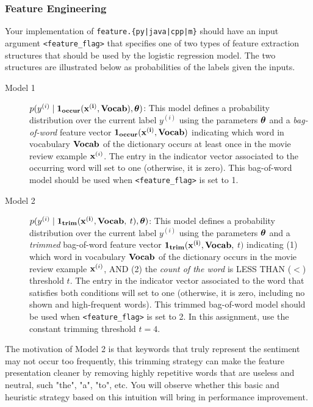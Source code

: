 \subsubsection{Feature Engineering} \label{feature}

Your implementation of \texttt{feature.\{py|java|cpp|m\}} should have an input argument \texttt{<feature\_flag>} that specifies one of two types of feature extraction structures that should be used by the logistic regression model. The two structures are illustrated below as probabilities of the labels given the inputs.

\begin{description}
    \item[Model 1] $p(y^{(i)} \mid \bf{1}_{occur}( \mathbf x^{(i)},Vocab), \boldsymbol \theta)$: This model defines a probability distribution over the current label $y^{(i)}$ using the parameters $\boldsymbol \theta$ and a \emph{bag-of-word} feature vector $\bf{1}_{occur}( \mathbf x^{(i)},Vocab)$ indicating which word in vocabulary $\bf{Vocab}$ of the dictionary occurs at least once in the movie review example $\mathbf x^{(i)}$. The entry in the indicator vector associated  to the occurring word will set to one (otherwise, it is zero). This bag-of-word model should be used when \texttt{<feature\_flag>} is set to 1.
    
    \item[Model 2] $p(y^{(i)} \mid \bf{1}_{trim}(  \mathbf x^{(i)},Vocab,$ $t), \boldsymbol \theta)$: This model defines a probability distribution over the current label $y^{(i)}$ using the parameters $\boldsymbol \theta$ and a \emph{trimmed} bag-of-word feature vector $\bf{1}_{trim}( \mathbf x^{(i)},Vocab,$ $t)$ indicating  (1) which word in vocabulary $\bf{Vocab}$ of the dictionary occurs in the movie review example $\mathbf x^{(i)}$, AND (2) the \emph{count of the word} is LESS THAN ($<$) threshold $t$. The entry in the indicator vector associated  to the word that satisfies both conditions will set to one (otherwise, it is zero, including no shown and high-frequent words). This trimmed bag-of-word model should be used when \texttt{<feature\_flag>} is set to 2. In this assignment, use the constant trimming threshold $t=4$.
    
\end{description}

The motivation of Model 2 is that keywords that truly represent the sentiment may not occur too frequently, this trimming strategy can make the feature presentation cleaner by removing highly repetitive words that are useless and neutral, such "the", "a", "to", etc. You will observe whether this basic and heuristic strategy based on this intuition will bring in performance improvement.

